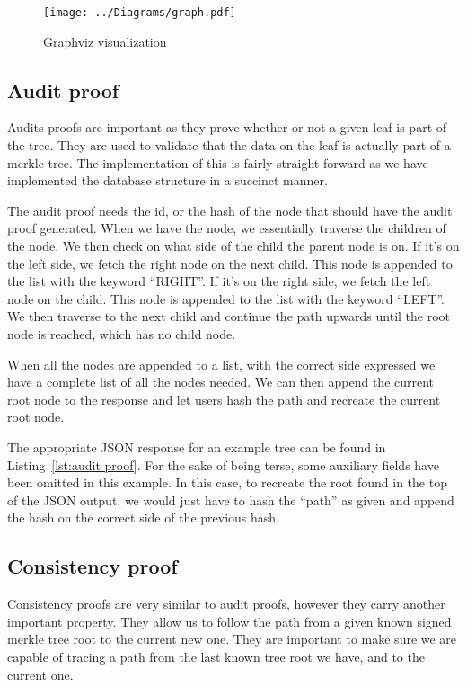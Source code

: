 \documentclass[../Main/thesis.tex]{subfiles}
\begin{document}
\begin{figure}[H]
\centering
\texttt{[image: ../Diagrams/graph.pdf]}
\caption{Graphviz visualization}
\label{fig:graphviz_pdf}
\end{figure}


\subsection*{Audit proof}%
\label{sub:audit_proof_implementation}
Audits proofs are important as they prove whether or not a given leaf is part of
the tree. They are used to validate that the data on the leaf is actually part
of a merkle tree. The implementation of this is fairly straight forward as we
have implemented the database structure in a succinct manner.

The audit proof needs the id, or the hash of the node that should have the audit
proof generated. When we have the node, we essentially traverse the children of
the node. We then check on what side of the child the parent node is on. If it's
on the left side, we fetch the right node on the next child. This node is
appended to the list with the keyword ``RIGHT''. If it's on the right side, we
fetch the left node on the child. This node is appended to the list with the
keyword ``LEFT''. We then traverse to the next child and continue the path
upwards until the root node is reached, which has no child node.

When all the nodes are appended to a list, with the correct side expressed we
have a complete list of all the nodes needed. We can then append the current
root node to the response and let users hash the path and recreate the current
root node.

The appropriate JSON response for an example tree can be found in
Listing~\ref{lst:audit proof}. For the sake of being terse, some auxiliary
fields have been omitted in this example. In this case, to recreate the root
found in the top of the JSON output, we would just have to hash the ``path'' as
given and append the hash on the correct side of the previous hash.

\subsection*{Consistency proof}%
\label{sub:consistency_proof_implementation}
Consistency proofs are very similar to audit proofs, however they carry another
important property. They allow us to follow the path from a given known signed
merkle tree root to the current new one. They are important to make sure we are
capable of tracing a path from the last known tree root we have, and to the
current one. 
\end{document}
